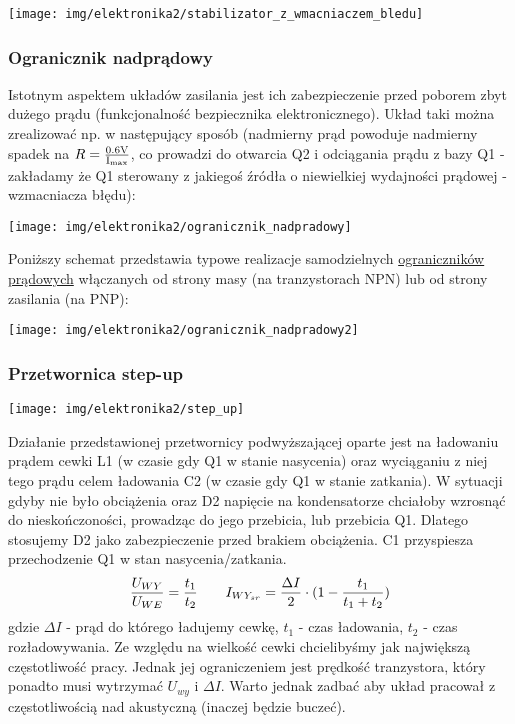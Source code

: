 \documentclass{pdfBooklets}
\begin{document}
\begin{center}\texttt{[image: img/elektronika2/stabilizator\_z\_wmacniaczem\_bledu]}\end{center}

\subsubsection{Ogranicznik nadprądowy}
Istotnym aspektem układów zasilania jest ich zabezpieczenie przed poborem zbyt dużego prądu (funkcjonalność bezpiecznika elektronicznego).
Układ taki można zrealizować np. w następujący sposób (nadmierny prąd powoduje nadmierny spadek na $R = {0.6\rm{V} \over I_{max}}$, co prowadzi do otwarcia Q2 i odciągania prądu z bazy Q1 - zakładamy że Q1 sterowany z jakiegoś źródła o niewielkiej wydajności prądowej - wzmacniacza błędu):

\begin{center}\texttt{[image: img/elektronika2/ogranicznik\_nadpradowy]}\end{center}

Poniższy schemat przedstawia typowe realizacje samodzielnych \href{https://en.wikipedia.org/wiki/Current limiting}{ograniczników prądowych} włączanych od strony masy (na tranzystorach NPN) lub od strony zasilania (na PNP):

\begin{center}\texttt{[image: img/elektronika2/ogranicznik\_nadpradowy2]}\end{center}

\subsubsection{Przetwornica step-up}

\begin{center}\texttt{[image: img/elektronika2/step\_up]}\end{center}

Działanie przedstawionej przetwornicy podwyższającej oparte jest na ładowaniu prądem cewki L1 (w czasie gdy Q1 w stanie nasycenia) oraz wyciąganiu z niej tego prądu celem ładowania C2 (w czasie gdy Q1 w stanie zatkania).
W sytuacji gdyby nie było obciążenia oraz D2 napięcie na kondensatorze chciałoby wzrosnąć do nieskończoności, prowadząc do jego przebicia, lub przebicia Q1.
Dlatego stosujemy D2 jako zabezpieczenie przed brakiem obciążenia.
C1 przyspiesza przechodzenie Q1 w stan nasycenia/zatkania.
$${U_{WY} \over U_{WE}} = {t_1 \over t_2} \qquad I_{WY_{sr}} = {\Delta I \over 2} \cdot (1 - {t_1 \over t_1 + t_2})$$
gdzie $\Delta I$ - prąd do którego ładujemy cewkę, $t_1$ - czas ładowania, $t_2$ - czas rozładowywania.
Ze względu na wielkość cewki chcielibyśmy jak największą częstotliwość pracy.
Jednak jej ograniczeniem jest prędkość tranzystora, który ponadto musi wytrzymać $U_{wy}$ i $\Delta I$.
Warto jednak zadbać aby układ pracował z częstotliwością nad akustyczną (inaczej będzie buczeć).
\end{document}
